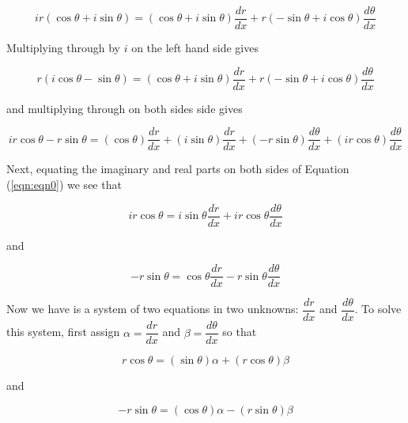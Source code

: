 \documentclass{article}
\theoremstyle{definition}
\begin{document}
\begin{equation*}
i r (\cos \theta + i \sin \theta) = (\cos \theta + i \sin \theta)
\dfrac{dr}{dx} + r (-\sin \theta + i \cos \theta) \dfrac{d
\theta}{dx} 
\end{equation*}

\bigskip
\noindent
Multiplying through by $i$ on the left hand side gives

\begin{equation*}
r (i \cos \theta - \sin \theta) = (\cos \theta + i \sin \theta)
\dfrac{dr}{dx} + r (-\sin \theta + i \cos \theta) \dfrac{d
\theta}{dx} 
\end{equation*}

\bigskip
\noindent
and multiplying through on both sides side gives


\begin{equation}
ir \cos \theta -  r \sin \theta = (\cos \theta) \dfrac{dr}{dx} + 
(i \sin \theta) \dfrac{dr}{dx} + (-r \sin \theta) \dfrac{d \theta}{dx}  + 
(i r \cos \theta) \dfrac{d \theta}{dx}
\label{eqn:eqn0}
\end{equation}

\bigskip
\noindent
Next, equating the imaginary and real parts on both sides of
Equation (\ref{eqn:eqn0}) we see that 

\bigskip
\begin{equation*}
ir \cos \theta =  i \sin \theta \dfrac{dr}{dx} +  i r \cos \theta \dfrac{d \theta}{dx}
\end{equation*}

\bigskip
\noindent
and

\begin{equation*}
-  r \sin \theta = \cos \theta \dfrac{dr}{dx} -r \sin \theta \dfrac{d \theta}{dx} 
\end{equation*}

\bigskip
\noindent
Now we have is a system of two equations in two unknowns:
$\dfrac{dr}{dx}$ and $\dfrac{d \theta}{dx}$.  To solve this
system, first assign $\alpha = \dfrac{dr}{dx}$ and $\beta =
\dfrac{d \theta}{dx}$ so that

\bigskip
\begin{equation}
r \cos \theta = (\sin \theta) \alpha + (r \cos \theta) \beta 
\label{eqn:eqn1}
\end{equation}

\bigskip
\noindent
and

\begin{equation}
- r \sin \theta = (\cos \theta) \alpha - (r \sin \theta) \beta 
\label{eqn:eqn2}
\end{equation}
\end{document}
